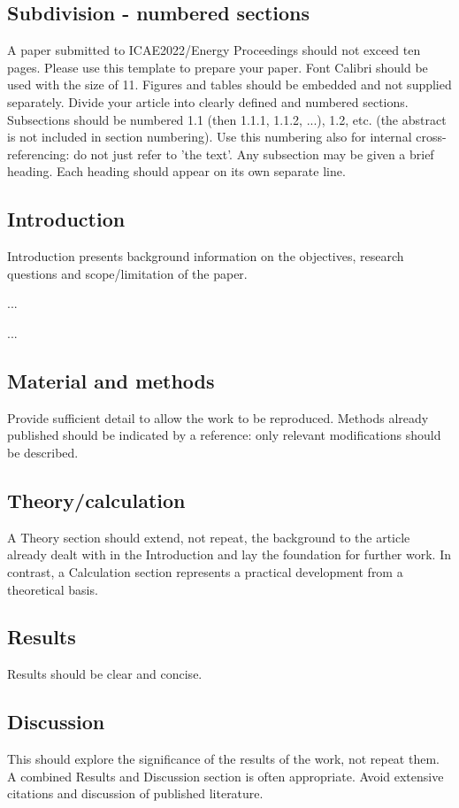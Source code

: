 \documentclass[11pt,a4paper,twoside,twocolumn]{article}
\begin{document}
\subsection{Subdivision - numbered sections}
A paper submitted to ICAE2022/Energy Proceedings should not exceed ten pages. Please use this template to prepare your paper. Font Calibri should be used with the size of 11. Figures and tables should be embedded and not supplied separately.
Divide your article into clearly defined and numbered sections. Subsections should be numbered 1.1 (then 1.1.1, 1.1.2, ...), 1.2, etc. (the abstract is not included in section numbering). Use this numbering also for internal cross-referencing: do not just refer to 'the text'. Any subsection may be given a brief heading. Each heading should appear on its own separate line.

\subsection{Introduction}
Introduction presents background information on the objectives, research questions and scope/limitation of the paper. 

...

...

\subsection{Material and methods}
Provide sufficient detail to allow the work to be reproduced. Methods already published should be indicated by a reference: only relevant modifications should be described.

\subsection{Theory/calculation}
A Theory section should extend, not repeat, the background to the article already dealt with in the Introduction and lay the foundation for further work. In contrast, a Calculation section represents a practical development from a theoretical basis.

\subsection{Results}
Results should be clear and concise.

\subsection{Discussion}
This should explore the significance of the results of the work, not repeat them. A combined Results and Discussion section is often appropriate. Avoid extensive citations and discussion of published literature.
\end{document}
